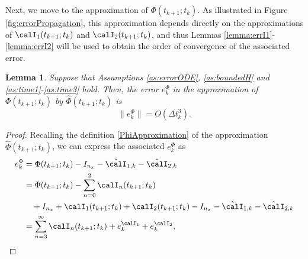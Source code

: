 \documentclass[DIV=12]{scrartcl} %
\newcommand{\err}{\ensuremath{e}}
\newtheorem{lemma}{Lemma}
\theoremstyle{definition}
\begin{document}
Next, we move to the approximation of $\Phi(t_{k+1};t_k)$. As illustrated in Figure \ref{fig:errorPropagation}, this approximation depends directly on the approximations of $\calI_{1}(t_{k+1};t_k)$ and $\calI_{2}(t_{k+1};t_k)$, and thus Lemmas \ref{lemma:errI1}-\ref{lemma:errI2} will be used to obtain the order of convergence of the associated error.

\begin{lemma}
\label{lemma:errPhiOrder}
Suppose that Assumptions \ref{as:errorODE}, \ref{as:boundedH} and \ref{as:time1}-\ref{as:time3} hold. Then, the error $\err_k^{\Phi}$ in the approximation of $\Phi(t_{k+1};t_k)$ by $\hat{\Phi}(t_{k+1};t_k)$ is
\[
\|\err_k^{\Phi}\|=O(\Delta t_k^3).
\]
\end{lemma}
\begin{proof}
Recalling the definition \eqref{PhiApproximation} of the approximation $\hat{\Phi}(t_{k+1};t_k)$, we can express the associated $\err_k^{\Phi}$ as
\begin{align}
\err^{\Phi}_k &=\Phi(t_{k+1};t_k)-I_{n_x} - \hat{\calI}_{1,k} - \hat{\calI}_{2,k} \nonumber\\
&=\Phi(t_{k+1};t_k) - \sum_{n=0}^{2} \calI_n(t_{k+1};t_k)  \nonumber \\
&\quad + I_{n_x} + \calI_1(t_{k+1};t_k) + \calI_2(t_{k+1};t_k) - I_{n_x} - \hat{\calI}_{1,k} - \hat{\calI}_{2,k} \nonumber\\
&=\sum_{n=3}^\infty\calI_n(t_{k+1};t_k) + \err^{\calI_1}_k + \err^{\calI_2}_k\label{errPhi},
\end{align}


\end{proof}
\end{document}
